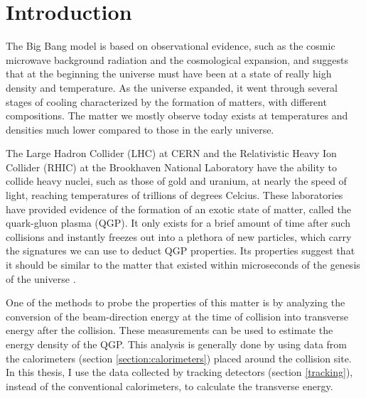 \chapter{Introduction} \label{ch:introduction}

The Big Bang model is based on observational evidence, such as the cosmic microwave background radiation and the cosmological expansion, and suggests that at the beginning the universe must have been at a state of really high density and temperature. As the universe expanded, it went through several stages of cooling characterized by the formation of matters, with different compositions. The matter we mostly observe today exists at temperatures and densities much lower compared to those in the early universe.

The Large Hadron Collider (LHC) at CERN and the Relativistic Heavy Ion Collider (RHIC) at the Brookhaven National Laboratory have the ability to collide heavy nuclei, such as those of gold and uranium, at nearly the speed of light, reaching temperatures of trillions of degrees Celcius. These laboratories have provided evidence of the formation of an exotic state of matter, called the quark-gluon plasma (QGP). It only exists for a brief amount of time after such collisions and instantly freezes out into a plethora of new particles, which carry the signatures we can use to deduct QGP properties. Its properties suggest that it should be similar to the matter that existed within microseconds of the genesis of the universe%
\cite{ADAMS2005102}.

One of the methods to probe the properties of this matter is by analyzing the conversion of the beam-direction energy at the time of collision into transverse energy after the collision. These measurements can be used to estimate the energy density of the QGP. This analysis is generally done by using data from the calorimeters (section \ref{section:calorimeters}) placed around the collision site. In this thesis, I use the data collected by tracking detectors (section \ref{tracking}), instead of the conventional calorimeters, to calculate the transverse energy.

